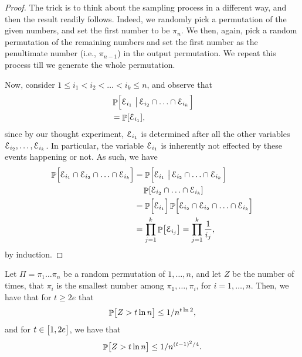 \begin{proof}
    The trick is to think about the sampling process in a different
    way, and then the result readily follows. Indeed, we randomly pick
    a permutation of the given numbers, and set the first number to be
    $\pi_n$. We then, again, pick a random permutation of the
    remaining numbers and set the first number as the penultimate
    number (i.e., $\pi_{n-1}$) in the output permutation. We repeat
    this process till we generate the whole permutation.
    
    Now, consider $1 \leq i_1 < i_2 < \ldots < i_k \leq n$, and
    observe that
    \begin{align*}
        &\Prob{\Bigl. \Event_{i_1} \sep{ \Event_{i_2} \cap \ldots \cap
              \Event_{i_{k}} }}%
        \\&= \Prob{\Event_{i_1}},%
    \end{align*}
    since by our thought experiment, $\Event_{i_1}$ is determined
    after all the other variables
    $\Event_{i_{2}}, \ldots, \Event_{i_k}$. In particular, the
    variable $\Event_{i_1}$ is inherently not effected by these events
    happening or not. As such, we have
    \begin{align*}
        \Prob{\Bigl. \Event_{i_1} \cap \Event_{i_2} \cap \ldots \cap
           \Event_{i_k} }%
        &=%
        \Prob{\Bigl. \Event_{i_1} \sep{ \Event_{i_2} \cap \ldots \cap
              \Event_{i_{k}} }}\\&\quad \Prob{ \Event_{i_2} \cap \ldots \cap
           \Event_{i_{k}} }%
        \\&%
        =%
        \Prob{\Bigl. \Event_{i_1}} \Prob{\Bigl. \Event_{i_2} \cap
           \Event_{i_2} \cap \ldots \cap \Event_{i_{k}} }%
        \\&=%
        \prod_{j=1}^k \Prob{\Event_{i_j}} = \prod_{j=1}^k
        \frac{1}{i_j},
    \end{align*}
    by induction.
\end{proof}


\begin{theorem}
    Let $\Pi=\pi_1 \ldots \pi_n$ be a random permutation of
    $1, \ldots, n$, and let $Z$ be the number of times, that $\pi_i$
    is the smallest number among $\pi_1, \ldots, \pi_i$, for
    $i=1,\ldots, n$. Then, we have that for $t \geq 2e$ that
    \[
    \Prob{ \bigl. Z > t \ln n} \leq 1/ n^{t \ln 2},
    \]
    and for $t \in \pbrc[]{1, 2e}$, we have that
    \[
    \Prob{\bigl. Z > t \ln n} \leq 1/ n^{(t-1)^2/4}.
    \]
\end{theorem}

